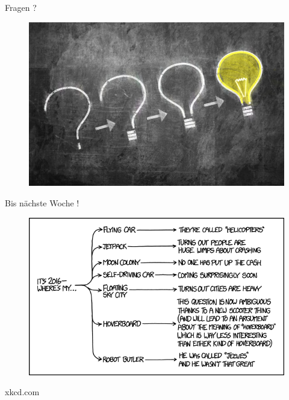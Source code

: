 \documentclass[18pt]{beamer}
\begin{document}
\begin{frame}{Fragen ?}
    \begin{figure}
        \includegraphics[scale=.5]{img/question_to_idea.jpg}
    \end{figure}
\end{frame}

\appendix
\beginbackup

\begin{frame}{Bis nächste Woche !}
    \begin{figure}
        \includegraphics[scale=.5]{img/2016.png}
    \end{figure}

    \begin{flushright}
    \footnotesize{xkcd.com}
    \end{flushright}
\end{frame}

\backupend
\end{document}
